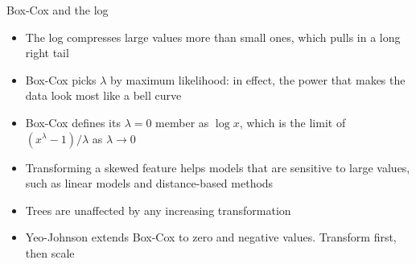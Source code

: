 \begin{frame}{Box-Cox and the log}
    \begin{itemize}
        \item The log compresses large values more than small ones, which pulls in a long right tail
        \item Box-Cox picks $\lambda$ by maximum likelihood: in effect, the power that makes the data look most like a bell curve
        \item Box-Cox defines its $\lambda = 0$ member as $\log x$, which is the limit of $(x^\lambda - 1)/\lambda$ as $\lambda \to 0$
        \item Transforming a skewed feature helps models that are sensitive to large values, such as linear models and distance-based methods
        \item Trees are unaffected by any increasing transformation
        \item Yeo-Johnson extends Box-Cox to zero and negative values. Transform first, then scale
    \end{itemize}
\end{frame}

